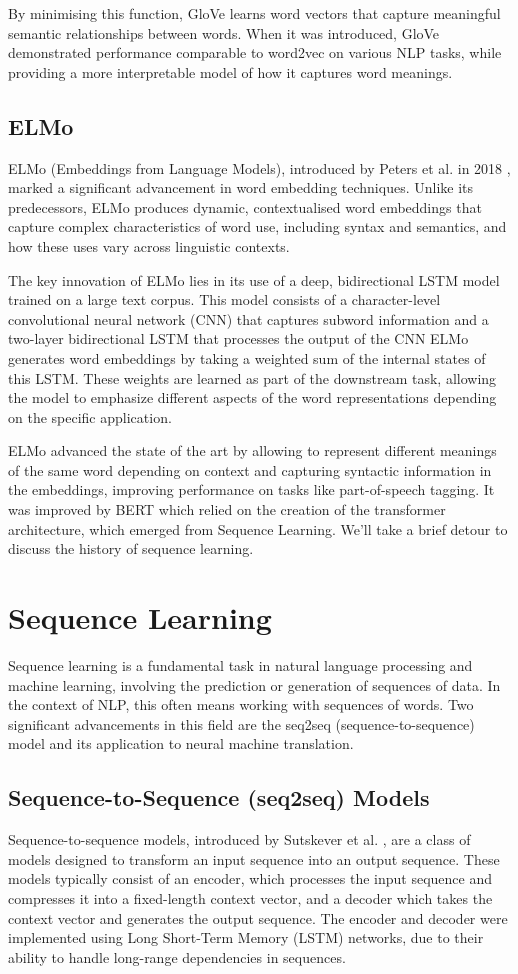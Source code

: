 \documentclass[a4paper, oneside]{discothesis}
\begin{document}
By minimising this function, GloVe learns word vectors that capture meaningful semantic relationships between words. When it was introduced, GloVe demonstrated performance comparable to word2vec on various NLP tasks, while providing a more interpretable model of how it captures word meanings.

\subsection{ELMo}
ELMo (Embeddings from Language Models), introduced by Peters et al. in 2018 \cite{peters2018deep}, marked a significant advancement in word embedding techniques. Unlike its predecessors, ELMo produces dynamic, contextualised word embeddings that capture complex characteristics of word use, including syntax and semantics, and how these uses vary across linguistic contexts.

The key innovation of ELMo lies in its use of a deep, bidirectional LSTM model trained on a large text corpus. This model consists of a character-level convolutional neural network (CNN) that captures subword information and a two-layer bidirectional LSTM that processes the output of the CNN
ELMo generates word embeddings by taking a weighted sum of the internal states of this LSTM. These weights are learned as part of the downstream task, allowing the model to emphasize different aspects of the word representations depending on the specific application.

ELMo advanced the state of the art by allowing to represent different meanings of the same word depending on context and capturing syntactic information in the embeddings, improving performance on tasks like part-of-speech tagging. It was improved by BERT which relied on the creation of the transformer architecture, which emerged from Sequence Learning. We'll take a brief detour to discuss the history of sequence learning. 

\section{Sequence Learning}
Sequence learning is a fundamental task in natural language processing and machine learning, involving the prediction or generation of sequences of data. In the context of NLP, this often means working with sequences of words. Two significant advancements in this field are the seq2seq (sequence-to-sequence) model and its application to neural machine translation.

\subsection{Sequence-to-Sequence (seq2seq) Models}
Sequence-to-sequence models, introduced by Sutskever et al. \cite{sutskever2014sequence}, are a class of models designed to transform an input sequence into an output sequence. 
These models typically consist of an encoder, which processes the input sequence and compresses it into a fixed-length context vector, and a decoder which takes the context vector and generates the output sequence.
The encoder and decoder were implemented using Long Short-Term Memory (LSTM) networks, due to their ability to handle long-range dependencies in sequences. 
\end{document}
